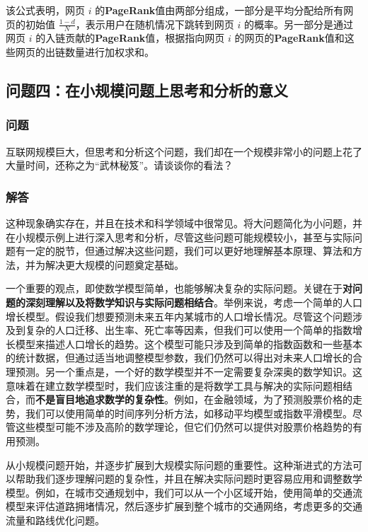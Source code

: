 \documentclass[a4,10pt,zihao=-4]{ctexart}
\begin{document}
该公式表明，网页 \( i \) 的\textbf{PageRank}值由两部分组成，一部分是平均分配给所有网页的初始值 \( \frac{1 - d}{N} \)，表示用户在随机情况下跳转到网页 \( i \) 的概率。另一部分是通过网页 \( i \) 的入链贡献的\textbf{PageRank}值，根据指向网页 \( i \) 的网页的\textbf{PageRank}值和这些网页的出链数量进行加权求和。

\subsection{问题四：在小规模问题上思考和分析的意义}
\subsubsection{问题}
互联网规模巨大，但思考和分析这个问题，我们却在一个规模非常小的问题上花了大量时间，还称之为“武林秘笈”。请谈谈你的看法？

\subsubsection{解答}

这种现象确实存在，并且在技术和科学领域中很常见。将大问题简化为小问题，并在小规模示例上进行深入思考和分析，尽管这些问题可能规模较小，甚至与实际问题有一定的脱节，但通过解决这些问题，我们可以更好地理解基本原理、算法和方法，并为解决更大规模的问题奠定基础。

一个重要的观点，即使数学模型简单，也能够解决复杂的实际问题。关键在于\textbf{对问题的深刻理解以及将数学知识与实际问题相结合}。举例来说，考虑一个简单的人口增长模型。假设我们想要预测未来五年内某城市的人口增长情况。尽管这个问题涉及到复杂的人口迁移、出生率、死亡率等因素，但我们可以使用一个简单的指数增长模型来描述人口增长的趋势。这个模型可能只涉及到简单的指数函数和一些基本的统计数据，但通过适当地调整模型参数，我们仍然可以得出对未来人口增长的合理预测。另一个重点是，一个好的数学模型并不一定需要复杂深奥的数学知识。这意味着在建立数学模型时，我们应该注重的是将数学工具与解决的实际问题相结合，而\textbf{不是盲目地追求数学的复杂性}。例如，在金融领域，为了预测股票价格的走势，我们可以使用简单的时间序列分析方法，如移动平均模型或指数平滑模型。尽管这些模型可能不涉及高阶的数学理论，但它们仍然可以提供对股票价格趋势的有用预测。

从小规模问题开始，并逐步扩展到大规模实际问题的重要性。这种渐进式的方法可以帮助我们逐步理解问题的复杂性，并且在解决实际问题时更容易应用和调整数学模型。例如，在城市交通规划中，我们可以从一个小区域开始，使用简单的交通流模型来评估道路拥堵情况，然后逐步扩展到整个城市的交通网络，考虑更多的交通流量和路线优化问题。
\end{document}
